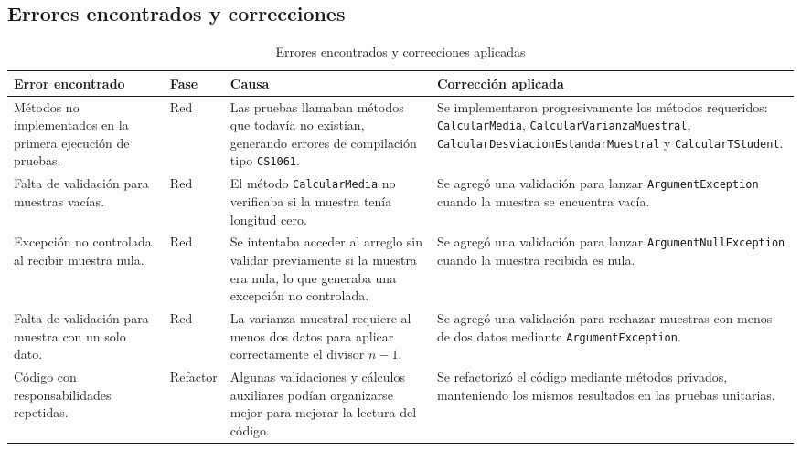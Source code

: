 \documentclass[12pt]{article}
\renewcommand{\arraystretch}{1.25}
\begin{document}
\subsection{Errores encontrados y correcciones}

\begin{table}[H]
\centering
\caption{Errores encontrados y correcciones aplicadas}
\scriptsize
\renewcommand{\arraystretch}{1.45}
\setlength{\tabcolsep}{3pt}
\begin{tabularx}{\textwidth}{|p{3.1cm}|p{1.6cm}|p{4.1cm}|Y|}
\hline
\textbf{Error encontrado} & \textbf{Fase} & \textbf{Causa} & \textbf{Corrección aplicada} \\ \hline

Métodos no implementados en la primera ejecución de pruebas. 
& Red 
& Las pruebas llamaban métodos que todavía no existían, generando errores de compilación tipo \texttt{CS1061}. 
& Se implementaron progresivamente los métodos requeridos: \texttt{CalcularMedia}, \texttt{CalcularVarianzaMuestral}, \texttt{CalcularDesviacionEstandarMuestral} y \texttt{CalcularTStudent}. \\ \hline

Falta de validación para muestras vacías. 
& Red 
& El método \texttt{CalcularMedia} no verificaba si la muestra tenía longitud cero. 
& Se agregó una validación para lanzar \texttt{ArgumentException} cuando la muestra se encuentra vacía. \\ \hline

Excepción no controlada al recibir muestra nula. 
& Red 
& Se intentaba acceder al arreglo sin validar previamente si la muestra era nula, lo que generaba una excepción no controlada. 
& Se agregó una validación para lanzar \texttt{ArgumentNullException} cuando la muestra recibida es nula. \\ \hline

Falta de validación para muestra con un solo dato. 
& Red 
& La varianza muestral requiere al menos dos datos para aplicar correctamente el divisor $n-1$. 
& Se agregó una validación para rechazar muestras con menos de dos datos mediante \texttt{ArgumentException}. \\ \hline

Código con responsabilidades repetidas. 
& Refactor 
& Algunas validaciones y cálculos auxiliares podían organizarse mejor para mejorar la lectura del código. 
& Se refactorizó el código mediante métodos privados, manteniendo los mismos resultados en las pruebas unitarias. \\ \hline

\end{tabularx}
\end{table}
\end{document}
